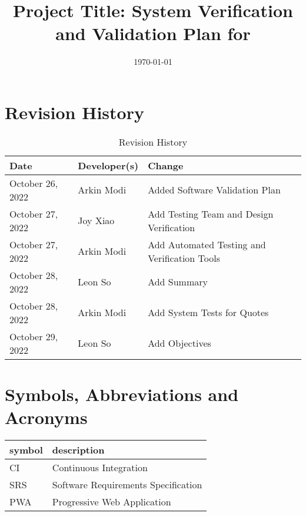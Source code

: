 \documentclass[12pt, titlepage]{article}
\begin{document}
\title{Project Title: System Verification and Validation Plan for \progname{}}
\author{\authname}
\date{\today}

\maketitle


\section{Revision History}

\begin{table}[hp]
	\caption{Revision History} \label{TblRevisionHistory}
	\begin{tabularx}{\textwidth}{llX}
		\toprule
		\textbf{Date}    & \textbf{Developer(s)} & \textbf{Change}                              \\
		\midrule
		October 26, 2022 & Arkin Modi            & Added Software Validation Plan               \\
		October 27, 2022 & Joy Xiao              & Add Testing Team and Design Verification     \\
		October 27, 2022 & Arkin Modi            & Add Automated Testing and Verification Tools \\
		October 28, 2022 & Leon So               & Add Summary                                  \\
		October 28, 2022 & Arkin Modi            & Add System Tests for Quotes                  \\
		October 29, 2022 & Leon So               & Add Objectives                               \\
		\bottomrule
	\end{tabularx}
\end{table}

\newpage

\tableofcontents

\listoftables
{}

\listoffigures
{}

\newpage

\section{Symbols, Abbreviations and Acronyms}

\renewcommand{\arraystretch}{1.2}
\begin{tabular}{l l}
	\toprule
	\textbf{symbol} & \textbf{description}                \\
	\midrule
	CI              & Continuous Integration              \\
	SRS             & Software Requirements Specification \\
	PWA             & Progressive Web Application         \\
	\bottomrule
\end{tabular}\\
\end{document}
